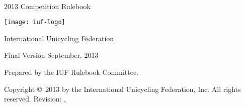 




\begin{titlepage}
\centering
\ \\
\vspace{5cm}
{\Huge 2013 Competition Rulebook}
\vspace{5mm}

\texttt{[image: iuf-logo]}

\vspace{5mm}
{\huge International Unicycling Federation}

\vspace{5mm}
{\Large Final Version \quad September, 2013}

\vspace{55mm}
Prepared by the IUF Rulebook Committee.

\vspace{5mm}
{\small Copyright \copyright\ 2013 by the International Unicycling Federation, Inc. All rights reserved.}
\small{Revision: \gitHash, \gitCommitterDate}

\end{titlepage}

\doparttoc
\tableofcontents

\mainmatter










\backmatter


